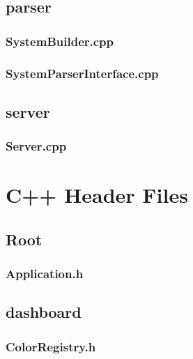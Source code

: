 \subsection*{parser}

\subsubsection*{SystemBuilder.cpp}


\subsubsection*{SystemParserInterface.cpp}


\subsection*{server}

\subsubsection*{Server.cpp}


\section{C++ Header Files}

\subsection*{Root}

\subsubsection*{Application.h}


\subsection*{dashboard}

\subsubsection*{ColorRegistry.h}


